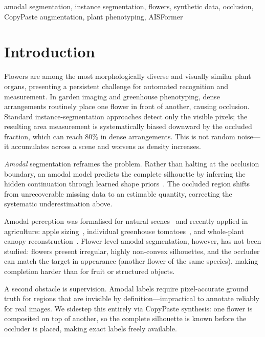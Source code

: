 \documentclass[conference]{IEEEtran}
\begin{document}
\begin{IEEEkeywords}
amodal segmentation, instance segmentation, flowers, synthetic data,
occlusion, CopyPaste augmentation, plant phenotyping, AISFormer
\end{IEEEkeywords}

\section{Introduction}

Flowers are among the most morphologically diverse and visually similar
plant organs, presenting a persistent challenge for automated recognition and
measurement.
In garden imaging and greenhouse phenotyping, dense arrangements routinely
place one flower in front of another, causing occlusion.
Standard instance-segmentation approaches detect only the visible pixels;
the resulting area measurement is systematically biased downward by the
occluded fraction, which can reach 80\% in dense arrangements.
This is not random noise—it accumulates across a scene and worsens as
density increases.

\textit{Amodal} segmentation reframes the problem.
Rather than halting at the occlusion boundary, an amodal model predicts
the complete silhouette by inferring the hidden continuation through learned
shape priors~\cite{zhu2017semantic}.
The occluded region shifts from unrecoverable missing data to an estimable
quantity, correcting the systematic underestimation above.

Amodal perception was formalised for natural scenes~\cite{zhu2017semantic}
and recently applied in agriculture: apple sizing~\cite{genemola2023apple},
individual greenhouse tomatoes~\cite{yang2024tomato,li2025cga}, and
whole-plant canopy reconstruction~\cite{saadatpour2025tomato}.
Flower-level amodal segmentation, however, has not been studied: flowers
present irregular, highly non-convex silhouettes, and the occluder can match
the target in appearance (another flower of the same species), making
completion harder than for fruit or structured objects.

A second obstacle is supervision.
Amodal labels require pixel-accurate ground truth for regions that are
invisible by definition—impractical to annotate reliably for real images.
We sidestep this entirely via CopyPaste synthesis: one flower is composited
on top of another, so the complete silhouette is known before the occluder
is placed, making exact labels freely available.
\end{document}
